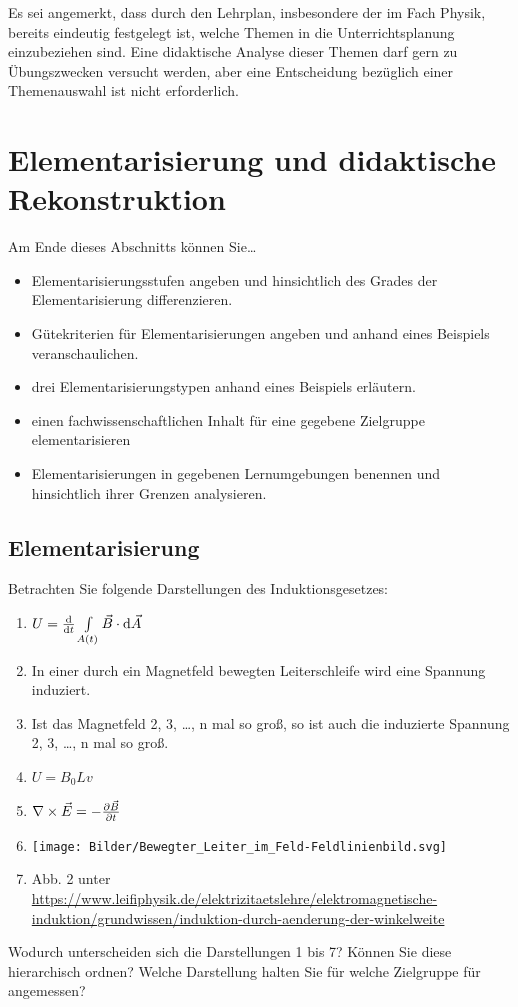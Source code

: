 \bip

Es sei angemerkt, dass durch den Lehrplan, insbesondere der im Fach Physik, bereits eindeutig festgelegt ist, welche Themen in die Unterrichtsplanung einzubeziehen sind. Eine didaktische Analyse dieser Themen darf gern zu \"{U}bungszwecken versucht werden, aber eine Entscheidung bez\"{u}glich einer Themenauswahl ist nicht erforderlich.

\bip\bip
\section{Elementarisierung und didaktische Rekonstruktion}

\begin{ziele}
	Am Ende dieses Abschnitts können Sie\dots
	\begin{itemize}
		\item Elementarisierungsstufen angeben und hinsichtlich des Grades der Elementarisierung differenzieren.
		\item Gütekriterien für Elementarisierungen angeben und anhand eines Beispiels veranschaulichen.
		\item drei Elementarisierungstypen anhand eines Beispiels erläutern.
		\item einen fachwissenschaftlichen Inhalt für eine gegebene Zielgruppe elementarisieren
		\item Elementarisierungen in gegebenen Lernumgebungen benennen und hinsichtlich ihrer Grenzen analysieren.
	\end{itemize}	
\end{ziele}

\subsection{Elementarisierung}\label{Elementarisierung}

\begin{uea}
	Betrachten Sie folgende Darstellungen des Induktionsgesetzes:
	\begin{enumerate}
		\item $U = \dv{t} \int\limits_{A(t)} \vec{B}\cdot \dd{\vec{A}}$
		\item In einer durch ein Magnetfeld bewegten Leiterschleife wird eine Spannung induziert.
		\item Ist das Magnetfeld 2, 3, \dots, n mal so groß, so ist auch die induzierte Spannung 2, 3, \dots, n mal so groß.
		\item $U=B_0 L v$
		\item $\nabla\times\vec{E} = - \pdv{\vec{B}}{t}$
		\item \texttt{[image: Bilder/Bewegter\_Leiter\_im\_Feld-Feldlinienbild.svg]}
		\item Abb. 2 unter \url{https://www.leifiphysik.de/elektrizitaetslehre/elektromagnetische-induktion/grundwissen/induktion-durch-aenderung-der-winkelweite}
	\end{enumerate}
	Wodurch unterscheiden sich die Darstellungen 1 bis 7? Können Sie diese hierarchisch ordnen? Welche Darstellung halten Sie für welche Zielgruppe für angemessen?
\end{uea}

